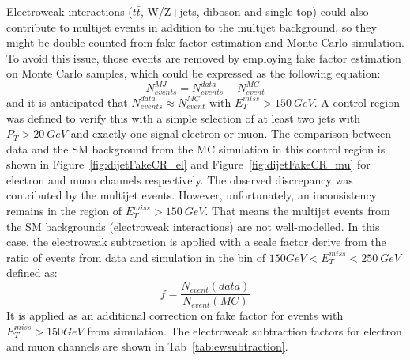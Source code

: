 Electroweak interactions ($t\bar{t}$, W/Z+jets, diboson and single top) could also contribute to multijet events in addition to the multijet background, so they might be double counted from fake factor estimation and Monte Carlo simulation. To avoid this issue, those events are removed by employing fake factor estimation on Monte Carlo samples, which could be expressed as the following equation:
\begin{equation}
 N^{MJ}_{events} = N^{data}_{events}-N^{MC}_{event}
\end{equation}
and it is anticipated that $N^{data}_{events}\approx N^{MC}_{event}$ with $E^{miss}_{T}>150~GeV$. A control region was defined to verify this with a simple selection of at least two jets with $P_{T}>20~GeV$ and exactly one signal electron or muon. The comparison between data and the SM background from the MC simulation in this control region is shown in Figure~\ref{fig:dijetFakeCR_el} and Figure~\ref{fig:dijetFakeCR_mu} for electron and muon channels respectively. The observed discrepancy was contributed by the multijet events. However, unfortunately, an inconsistency remains in the region of $E_{T}^{miss}>150~GeV$. That means the multijet events from the SM backgrounds (electroweak interactions) are not well-modelled. In this case, the electroweak subtraction is applied with a scale factor derive from the ratio of events from data and simulation in the bin of $150 GeV<E^{miss}_{T}<250~GeV$ defined as: 
\begin{equation}
f = \frac{N_{event}(data)}{N_{event}(MC)}
\end{equation}
It is applied as an additional correction on fake factor for events with $E_{T}^{miss}>150 GeV$ from simulation. The electroweak subtraction factors for electron and muon channels are shown in Tab~\ref{tab:ewsubtraction}.

